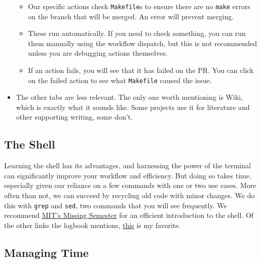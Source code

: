 \begin{itemize}
        \begin{itemize}
        \item Our specific actions check \texttt{Makefile}s 
        to ensure there are no \texttt{make} errors on the branch that will be merged. 
        An error will prevent merging. 
        \item These run automatically. 
        If you need to check something, 
        you can run them manually using the workflow dispatch, 
        but this is not recommended unless you are debugging actions themselves.
        \item If an action fails, you will see that it has failed on the PR. 
        You can click on the failed action to see what \texttt{Makefile} caused the issue. 
    \end{itemize}
    \item The other tabs are less relevant. 
    The only one worth mentioning is Wiki, which is exactly what it sounds like.
    Some projects use it for literature and other supporting writing, some don't. 
\end{itemize}

\subsection{The Shell}
Learning the shell has its advantages, 
and harnessing the power of the terminal can significantly improve your workflow and efficiency.
But doing so takes time, 
especially given our reliance on a few commands with one or two use cases. 
More often than not, we can succeed by recycling old code with minor changes. 
We do this with \texttt{grep} and \texttt{sed}, 
two commands that you will see frequently. 
We recommend \href{https://missing.csail.mit.edu/}{MIT's Missing Semester} 
for an efficient introduction to the shell.
Of the other links the logbook mentions, 
\href{https://ryanstutorials.net/linuxtutorial/}{this} is my favorite. 

\subsection{Managing Time}

